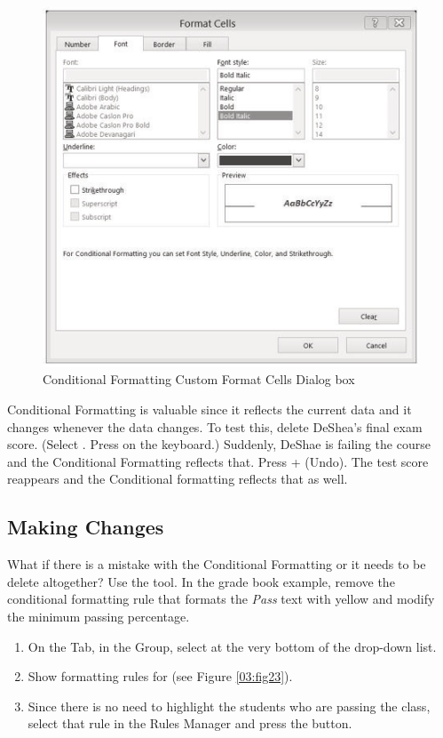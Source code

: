 \begin{figure}[H]
	\centering
	\includegraphics[width=\maxwidth{.95\linewidth}]{gfx/ch03_fig22}
	\caption{Conditional Formatting Custom Format Cells Dialog box}
	\label{03:fig22}
\end{figure}

Conditional Formatting is valuable since it reflects the current data and it changes whenever the data changes. To test this, delete DeShea's final exam score. (Select . Press  on the keyboard.) Suddenly, DeShae is failing the course and the Conditional Formatting reflects that. Press  +  (Undo). The test score reappears and the Conditional formatting reflects that as well.

\subsection{Making Changes}

What if there is a mistake with the Conditional Formatting or it needs to be delete altogether? Use the  tool. In the grade book example, remove the conditional formatting rule that formats the \textit{Pass} text with yellow and modify the minimum passing percentage.

\begin{enumerate}
	\item On the  Tab, in the  Group, select  at the very bottom of the  drop-down list.
	\item Show formatting rules for  (see Figure \ref{03:fig23}).
	\item Since there is no need to highlight the students who are passing the class, select that rule in the Rules Manager and press the  button.
\end{enumerate}

